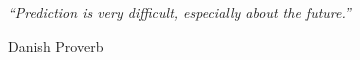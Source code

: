 \null\vfill
\textit{``Prediction is very difficult, especially about the future.''}

\begin{flushright}
Danish Proverb
\end{flushright}

\vfill\vfill\vfill\vfill\vfill\vfill\null

